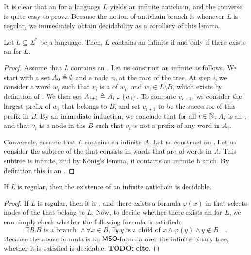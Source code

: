 It is clear that an  for a language $L$ yields an infinite
antichain, and the converse is quite easy to prove. Because the notion of
antichain branch is  whenever $L$ is regular, we
immediately obtain decidability as a corollary of this lemma.

\begin{lemma}
    Let $L \subseteq \Sigma^*$ be a language. Then, $L$ contains an infinite
     if and only if there exists an  for $L$.
\end{lemma}
\begin{proof}
    Assume that $L$ contains an . Let us construct an
    infinite  as follows. We start with a set $A_0 \triangleq
    \emptyset$ and a node $v_0$ at the root of the tree. At step $i$, we
    consider a word $w_i$ such that $v_i$ is a  of $w_i$, and $w_i
    \in L \setminus B$, which exists by definition of .
    We then set $A_{i+1} \triangleq A_i \cup \{ w_i \}$. To compute $v_{i+1}$, we
    consider the largest prefix of $w_i$ that belongs to $B$, and set $v_{i+1}$
    to be the successor of this prefix in $B$. By an immediate induction, we
    conclude that for all $i \in \mathbb{N}$, $A_i$ is an , and that
    $v_i$ is a node in the  $B$ such that $v_i$ is not a
    prefix of any word in $A_i$. 

    Conversely, assume that $L$ contains an infinite  $A$. Let us
    construct an . Let us consider the subtree of the
     that consists in words that are  of
    words in $A$. This subtree is infinite, and by König's lemma, it contains
    an infinite branch. By definition this is an .
\end{proof}

\begin{corollary}
    If $L$ is regular, then the existence of an infinite antichain is decidable.
\end{corollary}
\begin{proof}
    If $L$ is regular, then it is , and there 
    exists a formula $\varphi(x)$ in \kl{$\MSO$} that selects nodes 
    of the  that belong to $L$. Now, to decide whether there
    exists an  for $L$, we can simply check whether
    the following formula is satisfied:
    \begin{equation*}
        \exists B. 
        B \text{ is a branch } \land
        \forall x \in B, \exists y. y \text{ is a child of } x \land \varphi(y) \land y \not\in B
        \quad .
    \end{equation*}
    Because the above formula is an $\MSO$-formula over the infinite
    binary tree, whether it is satisfied is decidable.
    \textbf{TODO: cite}.
\end{proof}

